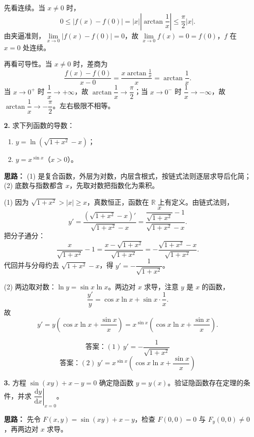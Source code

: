 先看连续。当 $x\ne0$ 时，
\[
0\le |f(x)-f(0)|=|x|\left|\arctan\frac{1}{x}\right|\le \frac{\pi}{2}|x|.
\]
由夹逼准则，$\lim\limits_{x\to0}|f(x)-f(0)|=0$，故 $\lim\limits_{x\to0}f(x)=0=f(0)$，$f$ 在 $x=0$ 处连续。

再看可导性。当 $x\ne0$ 时，差商为
\[
\frac{f(x)-f(0)}{x-0}=\frac{x\arctan\frac1x}{x}=\arctan\frac1x.
\]
当 $x\to0^+$ 时 $\dfrac1x\to+\infty$，故 $\arctan\dfrac1x\to\dfrac{\pi}{2}$；当 $x\to0^-$ 时 $\dfrac1x\to-\infty$，故 $\arctan\dfrac1x\to-\dfrac{\pi}{2}$。左右极限不相等。

\else \answerarea[8] \fi%

\textbf{2.} 求下列函数的导数：
\begin{enumerate}[label=(\arabic*),leftmargin=2.2em]
  \item $y=\ln\!\left(\sqrt{1+x^2}-x\right)$；
  \item $y=x^{\sin x}$（$x>0$）。
\end{enumerate}

\ifshowsolutions%

\textbf{思路：} (1) 是复合函数，外层为对数，内层含根式，按链式法则逐层求导后化简；(2) 底数与指数都含 $x$，先取对数把指数化为乘积。

(1) 因为 $\sqrt{1+x^2}>|x|\ge x$，真数恒正，函数在 $\mathbb R$ 上有定义。由链式法则，
\[
y'=\frac{\left(\sqrt{1+x^2}-x\right)'}{\sqrt{1+x^2}-x}
=\frac{\dfrac{x}{\sqrt{1+x^2}}-1}{\sqrt{1+x^2}-x}.
\]
把分子通分：
\[
\frac{x}{\sqrt{1+x^2}}-1=\frac{x-\sqrt{1+x^2}}{\sqrt{1+x^2}}
=-\frac{\sqrt{1+x^2}-x}{\sqrt{1+x^2}}.
\]
代回并与分母约去 $\sqrt{1+x^2}-x$，得 $y'=-\dfrac{1}{\sqrt{1+x^2}}$。

(2) 两边取对数：$\ln y=\sin x\ln x$。两边对 $x$ 求导，注意 $y$ 是 $x$ 的函数，
\[
\frac{y'}{y}=\cos x\ln x+\sin x\cdot\frac1x.
\]
故
\[
y'=y\left(\cos x\ln x+\frac{\sin x}{x}\right)
=x^{\sin x}\left(\cos x\ln x+\frac{\sin x}{x}\right).
\]

\[
\boxed{\text{答案：}(1)\ y'=-\frac{1}{\sqrt{1+x^2}}}
\]
\[
\boxed{\text{答案：}(2)\ y'=x^{\sin x}\left(\cos x\ln x+\frac{\sin x}{x}\right)}
\]
\else \answerarea[8] \fi%

\textbf{3.} 方程 $\sin(xy)+x-y=0$ 确定隐函数 $y=y(x)$。验证隐函数存在定理的条件，并求 $\left.\dfrac{\mathrm{d}y}{\mathrm{d}x}\right|_{x=0}$。

\ifshowsolutions%

\textbf{思路：} 先令 $F(x,y)=\sin(xy)+x-y$，检查 $F(0,0)=0$ 与 $F_y(0,0)\ne0$，再两边对 $x$ 求导。

